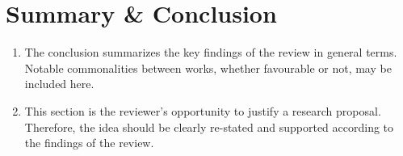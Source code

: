 \documentclass[a4paper,11pt]{article}
\begin{document}
\section{Summary \& Conclusion}

\begin{enumerate}
    \item The conclusion summarizes the key findings of the review in general terms. Notable commonalities between works, whether favourable or not, may be included here.
    \item This section is the reviewer’s opportunity to justify a research proposal. Therefore, the idea should be clearly re-stated and supported according to the findings of the review.
\end{enumerate}




\end{document}
